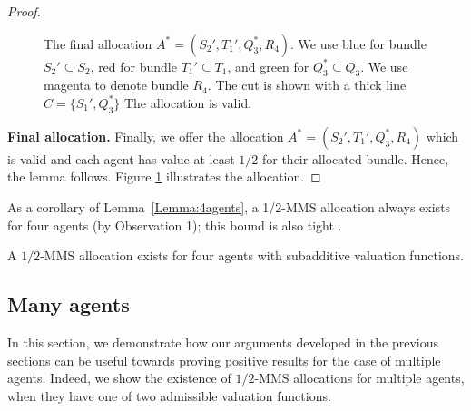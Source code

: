 \begin{proof}
\begin{figure}[t]
\begin{center}
\end{center}
\caption{The final allocation $A^*=(S_2',T_1',Q_3^*,R_4)$. We use blue for bundle $S_2' \subseteq S_2$, red for bundle $T_1' \subseteq T_1$, and green for $Q_3^* \subseteq Q_3$. We use magenta to denote bundle $R_4$. The cut is shown with a thick line $C=\{S_1',Q_3^*\}$ The allocation is valid.}
\label{fig:4agents4}
\end{figure}



    {\bf Final allocation.} Finally, we offer the allocation $A^*=(S_2',T_1',Q_3^*,R_4)$ which is valid and each agent has value at least $1/2$ for their allocated bundle. Hence, the lemma follows. Figure \ref{fig:4agents4} illustrates the allocation.
\end{proof}






As a corollary of Lemma~\ref{Lemma:4agents}, a 1/2-MMS allocation always
exists for four agents (by Observation 1); this bound is also
tight \cite{GhodsiHSSY22}. 
\begin{corollary}
\label{cor:4agents}
    A $1/2$-MMS allocation exists for four agents with subadditive valuation functions. 
\end{corollary}

\subsection{Many agents}
\label{sec:MoreAgents}
In this section, we demonstrate how our arguments developed in the previous sections can be useful towards proving positive results for the case of multiple agents. Indeed, we show the existence of $1/2$-MMS allocations for multiple agents, when they have one of two admissible valuation functions.

